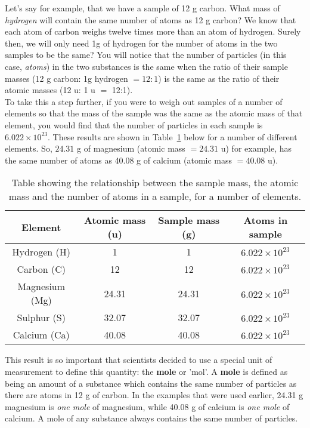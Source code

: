 Let's say for example, that we have a sample of 12 g carbon. What mass of \textit{hydrogen} will contain the same number of atoms as 12 g carbon? We know that each atom of carbon weighs twelve times more than an atom of hydrogen. Surely then, we will only need 1g of hydrogen for the number of atoms in the two samples to be the same? You will notice that the number of particles (in this case, \textit{atoms}) in the two substances is the same when the ratio of their sample masses (12 g carbon: 1g hydrogen $= 12:1$) is the same as the ratio of their atomic masses (12 u: 1 u $=$ 12:1).\\

To take this a step further, if you were to weigh out samples of a number of elements so that the mass of the sample was the same as the atomic mass of that element, you would find that the number of particles in each sample is $6.022 \times 10^{23}$. These results are shown in Table~\ref{tab:quant:atoms} below for a number of different elements. So, $24.31$ g of magnesium (atomic mass $= 24.31$ u) for example, has the same number of atoms as 40.08 g of calcium (atomic mass $= 40.08$ u). 

\begin{table}[H]
\begin{center}
\begin{tabular}{|c|c|c|c|}\hline
\textbf{Element} & \textbf{Atomic mass (u)} & \textbf{Sample mass (g)} & \textbf{Atoms in sample}\\\hline
Hydrogen (H) & 1 & 1 & $6.022 \times 10^{23}$\\\hline
Carbon (C) & 12 & 12 & $6.022 \times 10^{23}$\\\hline
Magnesium (Mg) & 24.31 & 24.31 & $6.022 \times 10^{23}$\\\hline
Sulphur (S) & 32.07 & 32.07 & $6.022 \times 10^{23}$\\\hline
Calcium (Ca) & 40.08 & 40.08 & $6.022 \times 10^{23}$\\\hline
\end{tabular}
\caption{Table showing the relationship between the sample mass, the atomic mass and the number of atoms in a sample, for a number of elements.}
\label{tab:quant:atoms}
\end{center}
\end{table}

This result is so important that scientists decided to use a special unit of measurement to define this quantity: the \textbf{mole} or 'mol'. A \textbf{mole} is defined as being an amount of a substance which contains the same number of particles as there are atoms in 12 g of carbon. In the examples that were used earlier, 24.31 g magnesium is \textit{one mole} of magnesium, while 40.08 g of calcium is \textit{one mole} of calcium. A mole of any substance always contains the same number of particles.

